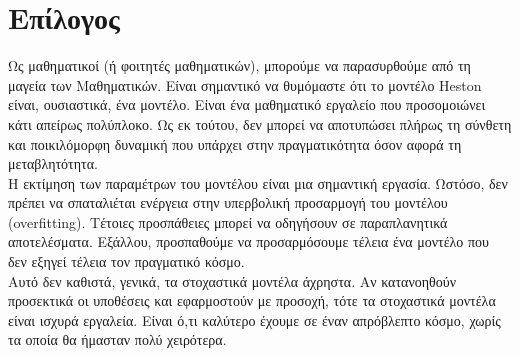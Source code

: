 \documentclass[12pt,a4paper,twoside,openany]{book}
\begin{document}
 
 	
 	
\chapter*{Επίλογος}
	 	Ως μαθηματικοί (ή φοιτητές μαθηματικών), μπορούμε να παρασυρθούμε από τη μαγεία των Μαθηματικών. Είναι σημαντικό να θυμόμαστε ότι το μοντέλο Heston είναι, ουσιαστικά, ένα μοντέλο. Είναι ένα μαθηματικό εργαλείο που προσομοιώνει κάτι απείρως πολύπλοκο. Ως εκ τούτου, δεν μπορεί να αποτυπώσει πλήρως τη σύνθετη και ποικιλόμορφη δυναμική που υπάρχει στην πραγματικότητα όσον αφορά τη μεταβλητότητα.
	 	\vspace{2.5mm}\\
	 	\noindent Η εκτίμηση των παραμέτρων του μοντέλου είναι μια σημαντική εργασία. Ωστόσο, δεν πρέπει να σπαταλιέται ενέργεια στην υπερβολική προσαρμογή του μοντέλου (overfitting). Τέτοιες προσπάθειες μπορεί να οδηγήσουν σε παραπλανητικά αποτελέσματα. Εξάλλου, προσπαθούμε να προσαρμόσουμε τέλεια ένα μοντέλο που δεν εξηγεί τέλεια τον πραγματικό κόσμο.
	 	\vspace{2.5mm}\\
	 	\noindent Αυτό δεν καθιστά, γενικά, τα στοχαστικά μοντέλα άχρηστα. Αν κατανοηθούν προσεκτικά οι υποθέσεις και εφαρμοστούν με προσοχή, τότε τα στοχαστικά μοντέλα είναι ισχυρά εργαλεία. Είναι ό,τι καλύτερο έχουμε σε έναν απρόβλεπτο κόσμο, χωρίς τα οποία θα ήμασταν πολύ χειρότερα.
 	
 	
 	
 	
 	
\end{document}
